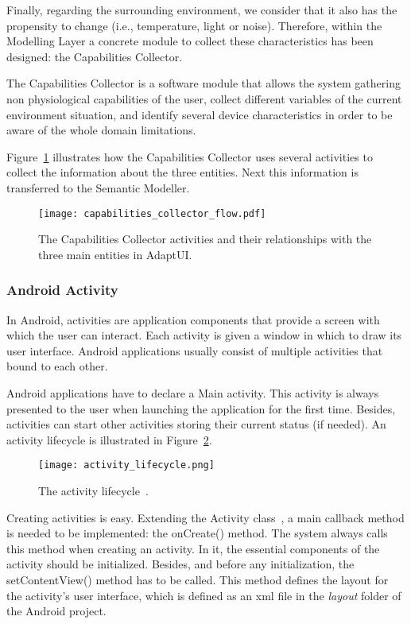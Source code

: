 Finally, regarding the surrounding environment, we consider that it also has the 
propensity to change (i.e., temperature, light or noise). Therefore, within the 
Modelling Layer a concrete module to collect these characteristics has been 
designed: the Capabilities Collector.

The Capabilities Collector is a software module that allows the system gathering 
non physiological capabilities of the user, collect different variables of the 
current environment situation, and identify several device characteristics in 
order to be aware of the whole domain limitations.

Figure~\ref{fig:capabilities_collector_flow} illustrates how the Capabilities 
Collector uses several activities to collect the information about the three 
entities. Next this information is transferred to the Semantic Modeller.

\begin{figure}
\centering
\texttt{[image: capabilities\_collector\_flow.pdf]}
\caption{The Capabilities Collector activities and their relationships with the
three main entities in AdaptUI.}
\label{fig:capabilities_collector_flow}
\end{figure}


\subsubsection{Android Activity}
\label{sec:activities}

In Android, activities are application components that provide a screen with
which the user can interact. Each activity is given a window in which to draw
its user interface. Android applications usually consist of multiple activities 
that bound to each other. 

Android applications have to declare a Main activity. This activity is always
presented to the user when launching the application for the first time. Besides,
activities can start other activities storing their current status (if needed).
An activity lifecycle is illustrated in Figure~\ref{fig:activity_lifecycle}.

\begin{figure}
\centering
\texttt{[image: activity\_lifecycle.png]}
\caption{The activity lifecycle~\citep{activities}.}
\label{fig:activity_lifecycle}
\end{figure}

Creating activities is easy. Extending the Activity class~\citep{activities},
a main callback method is needed to be implemented: the onCreate() method. The
system always calls this method when creating an activity. In it, the essential
components of the activity should be initialized. Besides, and before any
initialization, the setContentView() method has to be called. This method defines
the layout for the activity's user interface, which is defined as an \ac{xml}
file in the \textit{layout} folder of the Android project.

